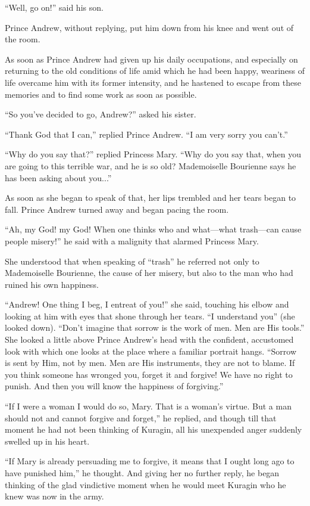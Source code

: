 ``Well, go on!'' said his son.

Prince Andrew, without replying, put him down from his knee and
went out of the room.

As soon as Prince Andrew had given up his daily occupations, and
especially on returning to the old conditions of life amid which
he had been happy, weariness of life overcame him with its former
intensity, and he hastened to escape from these memories and to
find some work as soon as possible.

``So you've decided to go, Andrew?'' asked his sister.

``Thank God that I can,'' replied Prince Andrew. ``I am very
sorry you can't.''

``Why do you say that?'' replied Princess Mary. ``Why do you say
that, when you are going to this terrible war, and he is so old?
Mademoiselle Bourienne says he has been asking about you...''

As soon as she began to speak of that, her lips trembled and her
tears began to fall. Prince Andrew turned away and began pacing
the room.

``Ah, my God! my God! When one thinks who and what---what
trash---can cause people misery!'' he said with a malignity that
alarmed Princess Mary.

She understood that when speaking of ``trash'' he referred not
only to Mademoiselle Bourienne, the cause of her misery, but also
to the man who had ruined his own happiness.

``Andrew! One thing I beg, I entreat of you!'' she said, touching
his elbow and looking at him with eyes that shone through her
tears. ``I understand you'' (she looked down). ``Don't imagine
that sorrow is the work of men. Men are His tools.'' She looked a
little above Prince Andrew's head with the confident, accustomed
look with which one looks at the place where a familiar portrait
hangs. ``Sorrow is sent by Him, not by men. Men are His
instruments, they are not to blame. If you think someone has
wronged you, forget it and forgive! We have no right to
punish. And then you will know the happiness of forgiving.''

``If I were a woman I would do so, Mary. That is a woman's
virtue. But a man should not and cannot forgive and forget,'' he
replied, and though till that moment he had not been thinking of
Kuragin, all his unexpended anger suddenly swelled up in his
heart.

``If Mary is already persuading me to forgive, it means that I
ought long ago to have punished him,'' he thought. And giving her
no further reply, he began thinking of the glad vindictive moment
when he would meet Kuragin who he knew was now in the army.


